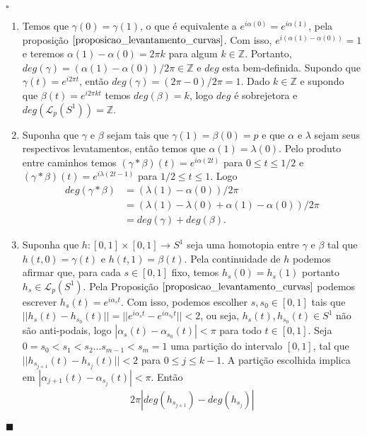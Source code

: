 \documentclass[12pt]{book}
\newenvironment{prova}[1]{$\square$ #1}{\hfill$\blacksquare$}
\newcommand{\caminhospontobasegeral}[2]{\mathcal{L}_{#1}(#2)}
\newcommand{\circulo}{S^{1}}
\newcommand{\inteiros}{\mathbb{Z}}
\newcommand{\norma}[1]{||#1||}
\begin{document}
		\begin{prova}
			\begin{enumerate}
				\item Temos que $\gamma(0) = \gamma(1)$, o que é equivalente a $e^{i\alpha(0)} = e^{i\alpha(1)}$, pela proposição $\ref{proposicao_levantamento_curvas}$. Com isso, $e^{i(\alpha(1)-\alpha(0))} = 1$ e teremos $\alpha(1)-\alpha(0) = 2\pi k$ para algum $k \in \inteiros$. Portanto, $deg(\gamma) = (\alpha(1)-\alpha(0))/2\pi \in \inteiros$ e $deg$ esta bem-definida. Supondo que $\gamma(t) = e^{i2\pi t}$, então $deg(\gamma) = (2\pi -0)/2\pi =1$. Dado $k \in \inteiros$ e supondo que $\beta(t) = e^{i2\pi kt}$ temos $deg(\beta) = k$, logo $deg$ é sobrejetora e $deg(\caminhospontobasegeral{p}{\circulo}) = \inteiros$.
				\item Suponha que $\gamma$ e $\beta$ sejam tais que $\gamma(1)= \beta(0) = p$ e que $\alpha$ e $\lambda$ sejam seus respectivos levatamentos, então temos que $\alpha(1) = \lambda(0)$. Pelo produto entre caminhos temos $(\gamma*\beta)(t) = e^{i\alpha(2t)}$ para $0\leq t\leq 1/2$ e  $(\gamma*\beta)(t) = e^{i\lambda(2t - 1)}$ para $1/2\leq t\leq 1$. Logo 
				$$
				\begin{aligned}
				deg(\gamma*\beta) &= (\lambda(1)- \alpha(0))/2\pi 
				\\
				&= (\lambda(1) -\lambda(0)+ \alpha(1)- \alpha(0))/2\pi
				\\
				&= deg(\gamma)+deg(\beta).
				\end{aligned}
				$$  
				\item Suponha que $h:[0,1]\times [0,1]\to S^{1}$ seja uma homotopia entre $\gamma$ e $\beta$ tal que $h(t,0) = \gamma(t)$ e $h(t,1) = \beta(t)$. Pela continuidade de $h$ podemos afirmar que, para cada $s \in [0,1]$ fixo, temos $h_{s}(0) = h_{s}(1)$ portanto $h_{s} \in \caminhospontobasegeral{p}{\circulo}$. Pela Proposição $\ref{proposicao_levantamento_curvas}$ podemos escrever $h_{s}(t) = e^{i\alpha_{s}t}$. Com isso, podemos escolher $s, s_{0 }\in [0,1]$ tais que $\norma{h_{s}(t)-h_{s_{0}}(t)} =\norma{e^{i\alpha_{s}t} - e^{i\alpha_{s_{0}}t}} <2$, ou seja, $h_{s}(t), h_{s_{0}}(t) \in \circulo$ não são anti-podais, logo $|\alpha_{s}(t)-\alpha_{s_{0}}(t)| <\pi$ para todo $t\in [0,1]$. Seja $0=s_{0}<s_{1}<s_{2}\dots s_{m-1}<s_{m} = 1$ uma partição do intervalo $[0,1]$, tal que $\norma{h_{s_{j+1}}(t)-h_{s_{j}}(t)}<2$ para $0\leq j \leq k-1$. A partição escolhida implica em $|\alpha_{j+1}(t)-\alpha_{s_{j}}(t)| <\pi$. Então
				$$
				\begin{aligned}
					2\pi|deg(h_{s_{j+1}})-deg(h_{s_{j}})| 

\end{aligned}$$
\end{enumerate}
\end{prova}
\end{document}
